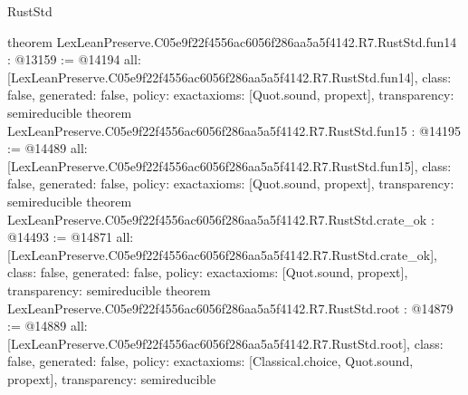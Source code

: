 \begin{lexlean}{RustStd}
\begin{coremodule}
{}
theorem LexLeanPreserve.C05e9f22f4556ac6056f286aa5a5f4142.R7.RustStd.fun14 : @13159 := @14194 {
  all: [LexLeanPreserve.C05e9f22f4556ac6056f286aa5a5f4142.R7.RustStd.fun14],
  class: false,
  generated: false,
  policy: exact{axioms: [Quot.sound, propext]},
  transparency: semireducible
}
theorem LexLeanPreserve.C05e9f22f4556ac6056f286aa5a5f4142.R7.RustStd.fun15 : @14195 := @14489 {
  all: [LexLeanPreserve.C05e9f22f4556ac6056f286aa5a5f4142.R7.RustStd.fun15],
  class: false,
  generated: false,
  policy: exact{axioms: [Quot.sound, propext]},
  transparency: semireducible
}
theorem LexLeanPreserve.C05e9f22f4556ac6056f286aa5a5f4142.R7.RustStd.crate_ok : @14493 := @14871 {
  all: [LexLeanPreserve.C05e9f22f4556ac6056f286aa5a5f4142.R7.RustStd.crate_ok],
  class: false,
  generated: false,
  policy: exact{axioms: [Quot.sound, propext]},
  transparency: semireducible
}
theorem LexLeanPreserve.C05e9f22f4556ac6056f286aa5a5f4142.R7.RustStd.root : @14879 := @14889 {
  all: [LexLeanPreserve.C05e9f22f4556ac6056f286aa5a5f4142.R7.RustStd.root],
  class: false,
  generated: false,
  policy: exact{axioms: [Classical.choice, Quot.sound, propext]},
  transparency: semireducible
}


\end{coremodule}
\end{lexlean}
